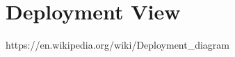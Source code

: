 \documentclass[../../../../dd.tex]{subfiles}
\begin{document}
	\section{Deployment View}
		https://en.wikipedia.org/wiki/Deployment_diagram
	
	
\end{document}
